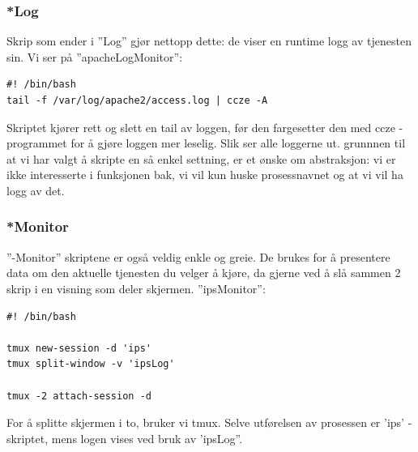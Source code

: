 \documentclass{article}
\begin{document}
\subsubsection{*Log}
Skrip som ender i ''Log'' gjør nettopp dette: de viser en runtime logg av tjenesten sin. Vi ser på ''apacheLogMonitor'':
\begin{lstlisting}
#! /bin/bash
tail -f /var/log/apache2/access.log | ccze -A
\end{lstlisting}
Skriptet kjører rett og slett en tail av loggen, før den fargesetter den med ccze - programmet for å gjøre loggen mer leselig.  Slik ser alle loggerne ut. grunnnen til at vi har valgt å skripte en så enkel settning, er et ønske om abstraksjon: vi er ikke interesserte i funksjonen bak, vi vil kun huske prosessnavnet og at vi vil ha logg av det. 
\subsubsection{*Monitor}
''-Monitor'' skriptene er også veldig enkle og greie. De brukes for å presentere data om den aktuelle tjenesten du velger å kjøre, da gjerne ved å slå sammen 2 skrip i en visning som deler skjermen. ''ipsMonitor'':
\begin{lstlisting}
#! /bin/bash

tmux new-session -d 'ips'
tmux split-window -v 'ipsLog'

tmux -2 attach-session -d
\end{lstlisting}
For å splitte skjermen i to, bruker vi tmux. Selve utførelsen av prosessen er 'ips' - skriptet, mens logen vises ved bruk av 'ipsLog''. 
\end{document}
